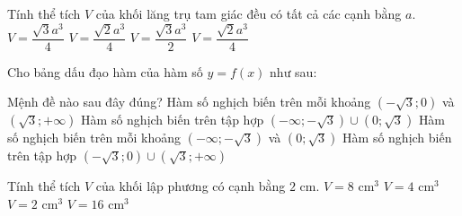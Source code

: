 \begin{ex}%
 Tính thể tích $V$ của khối lăng trụ tam giác đều có tất cả các cạnh bằng $a$.
\choice
{\True $V=\dfrac{\sqrt{3}a^3}{4}$}
{$V=\dfrac{\sqrt{2}a^3}{4}$}
{$V=\dfrac{\sqrt{3}a^3}{2}$}
{$V=\dfrac{\sqrt{2}a^3}{4}$}
\end{ex}

\begin{ex}%
Cho bảng dấu đạo hàm của hàm số $y=f(x)$ như sau:
\begin{center}
\end{center}
Mệnh đề nào sau đây đúng?
\choice
{Hàm số nghịch biến trên mỗi khoảng $\left(-\sqrt{3}; 0\right)$ và $\left( \sqrt{3}; + \infty \right)$}
{Hàm số nghịch biến trên tập hợp $\left( -\infty; -\sqrt{3} \right) \cup \left(0;\sqrt{3} \right)$}
{\True Hàm số nghịch biến trên mỗi khoảng $\left( -\infty ; -\sqrt{3} \right)$ và $\left(0; \sqrt{3} \right)$}
{Hàm số nghịch biến trên tập hợp $\left(-\sqrt{3};0 \right)\cup \left( \sqrt{3};+\infty \right)$}
\end{ex}

\begin{ex}%
Tính thể tích $V$ của khối lập phương có cạnh bằng $2$ cm.
\choice
{\True $V=8$ cm$^3$}
{$V=4$ cm$^3$}
{$V=2$ cm$^3$}
{$V=16$ cm$^3 $}
\end{ex}

